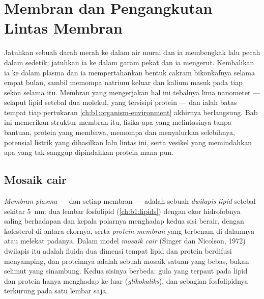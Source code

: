 \chapter{Membran dan Pengangkutan Lintas Membran}\label{ch:b1:membranes-transport}

Jatuhkan sebuah  darah merah ke dalam air murni dan ia membengkak
lalu pecah dalam sedetik; jatuhkan ia ke dalam garam pekat dan ia
mengerut. Kembalikan ia ke dalam plasma dan ia mempertahankan bentuk
cakram bikonkafnya selama empat bulan, sambil memompa natrium keluar
dan kalium masuk pada tiap sekon selama itu. Membran yang mengerjakan
hal ini tebalnya lima nanometer --- selaput lipid setebal dua molekul,
yang tersisipi protein --- dan ialah batas tempat tiap pertukaran
\cref{ch:b1:organism-environment} akhirnya berlangsung. Bab ini
memerikan struktur membran itu, fisika apa yang melintasinya tanpa
bantuan, protein yang membawa, memompa dan menyalurkan selebihnya,
potensial listrik yang dihasilkan lalu lintas ini, serta vesikel yang
memindahkan apa yang tak sanggup dipindahkan protein mana pun.

\section{Mosaik cair}

\begin{definition}\label{def:b1:membranes-transport:membrane}
\emph{Membran plasma} --- dan setiap membran 
--- adalah sebuah \emph{dwilapis lipid} setebal
sekitar \qty{5}{nm}: dua lembar fosfolipid (\cref{ch:b1:lipids}) dengan
ekor hidrofobnya saling berhadapan dan kepala polarnya menghadap kedua
sisi berair, dengan kolesterol di antara ekornya, serta \emph{protein
membran} yang terbenam di dalamnya atau melekat
padanya. Dalam model \emph{mosaik cair}
(Singer dan Nicolson, 1972) dwilapis itu adalah fluida dua dimensi
tempat lipid dan protein berdifusi menyamping, dan proteinnya adalah
sebuah mosaik satuan yang bebas, bukan selimut yang sinambung. Kedua
sisinya berbeda: gula yang terpaut pada lipid dan protein hanya
menghadap ke luar (\emph{glikokaliks}), dan sebagian fosfolipidnya
terkurung pada satu lembar saja.
\end{definition}

